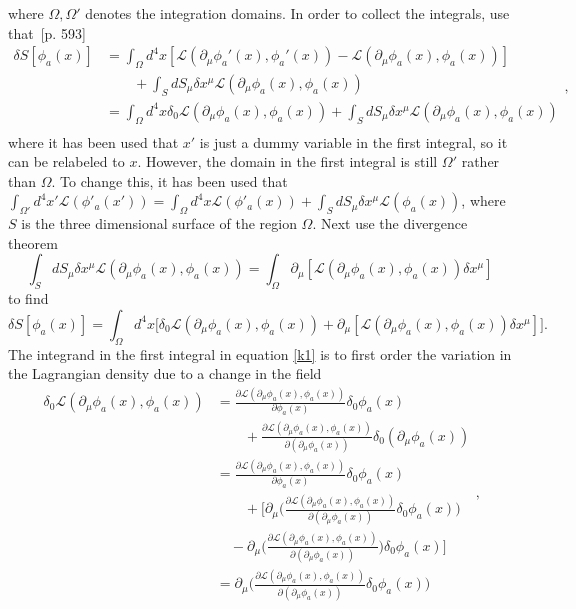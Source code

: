 where $\Omega, \Omega'$ denotes the integration domains. In order to collect the integrals, use that~\citep{Goldstein}[p. 593]
\begin{equation}
	\begin{split}
		\delta S[\phi_a(x)]&=\int_\Omega d^4x [\mathcal{L}(\partial_\mu\phi_a'(x),\phi_a'(x))-\mathcal{L}(\partial_\mu\phi_a(x),\phi_a(x))]\\
		&\qquad+\int_S dS_\mu\delta x^\mu\mathcal{L}(\partial_\mu\phi_a(x),\phi_a(x))\\
		&=\int_\Omega d^4x \delta_0\mathcal{L}(\partial_\mu\phi_a(x),\phi_a(x))+\int_S dS_\mu\delta x^\mu\mathcal{L}(\partial_\mu\phi_a(x),\phi_a(x))\\
	\end{split},
	\label{k1}
\end{equation} 
where it has been used that $x'$ is just a dummy variable in the first integral, so it can be relabeled to $x$. However, the domain in the first integral is still $\Omega'$ rather than $\Omega$. To change this, it has been used that $\int_{\Omega'} d^4x' \mathcal{L}(\phi'_a(x'))=\int_{\Omega} d^4x \mathcal{L}(\phi'_a(x))+\int_{S} dS_\mu \delta x^\mu \mathcal{L}(\phi_a(x))$, where $S$ is the three dimensional surface of the region $\Omega$. Next use the divergence theorem
\begin{equation}
	\int_S dS_\mu \delta x^\mu \mathcal{L}(\partial_\mu\phi_a(x),\phi_a(x))=\int_{\Omega} \partial_\mu[\mathcal{L}(\partial_\mu\phi_a(x),\phi_a(x))\delta x^\mu]
\end{equation}
to find
\begin{equation}
	\delta S[\phi_a(x)]=\int_\Omega d^4x \bigg[\delta_0\mathcal{L}(\partial_\mu\phi_a(x),\phi_a(x))+\partial_\mu[\mathcal{L}(\partial_\mu\phi_a(x),\phi_a(x))\delta x^\mu]\bigg].
	\label{k3}
\end{equation} 
The integrand in the first integral in equation \eqref{k1} is to first order the variation in the Lagrangian density due to a change in the field
\begin{equation}
	\begin{split}
		\delta_0\mathcal{L}(\partial_\mu\phi_a(x),\phi_a(x))&=\frac{\partial \mathcal{L}(\partial_\mu\phi_a(x),\phi_a(x))}{\partial \phi_a(x)}\delta_0 \phi_a(x)\\
		&\qquad+\frac{\partial \mathcal{L}(\partial_\mu\phi_a(x),\phi_a(x))}{\partial (\partial_\mu \phi_a(x))}\delta_0 (\partial_\mu\phi_a(x))\\
		&= \frac{\partial \mathcal{L}(\partial_\mu\phi_a(x),\phi_a(x))}{\partial \phi_a(x)}\delta_0 \phi_a(x)\\
		&\qquad+\bigg[\partial_\mu\bigg(\frac{\partial \mathcal{L}(\partial_\mu\phi_a(x),\phi_a(x))}{\partial (\partial_\mu \phi_a(x))}\delta_0\phi_a(x)\bigg)\\
		&\quad-\partial_\mu \bigg(\frac{\partial \mathcal{L}(\partial_\mu\phi_a(x),\phi_a(x))}{\partial (\partial_\mu \phi_a(x))}\bigg)\delta_0\phi_a(x)\bigg]\\
		&=\partial_\mu\bigg(\frac{\partial \mathcal{L}(\partial_\mu\phi_a(x),\phi_a(x))}{\partial (\partial_\mu \phi_a(x))}\delta_0\phi_a(x)\bigg)
	\end{split},
	\label{k2}
\end{equation} 

